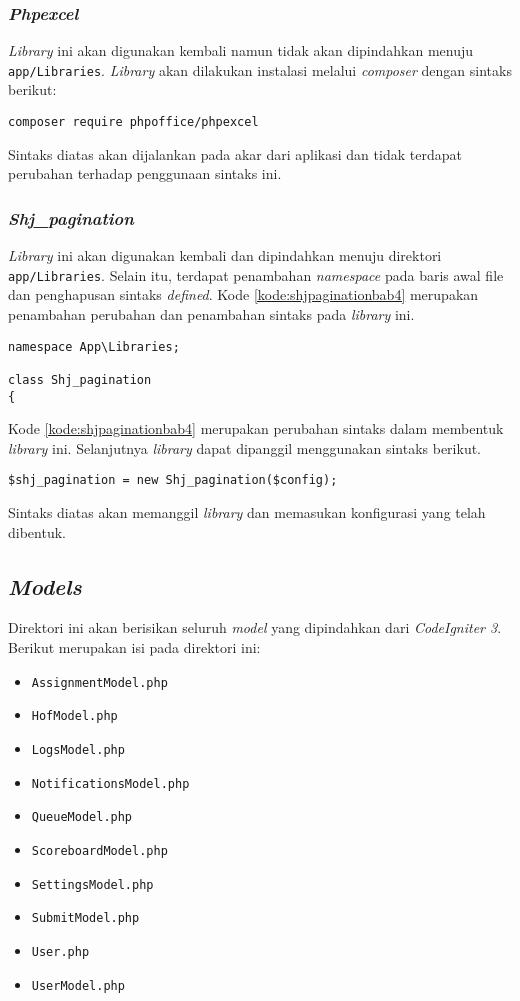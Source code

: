 \subsubsection{\textit{Phpexcel}}
\textit{Library} ini akan digunakan kembali namun tidak akan dipindahkan menuju \texttt{app/Libraries}. \textit{Library} akan dilakukan instalasi melalui \textit{composer} dengan sintaks berikut:
\begin{center}
	\verb|composer require phpoffice/phpexcel|
\end{center}
Sintaks diatas akan dijalankan pada akar dari aplikasi dan tidak terdapat perubahan terhadap penggunaan sintaks ini.

\subsubsection{\textit{Shj\_pagination}}
\textit{Library} ini akan digunakan kembali dan dipindahkan menuju direktori \texttt{app/Libraries}. Selain itu, terdapat penambahan \textit{namespace} pada baris awal file dan penghapusan sintaks \textit{defined}. Kode \ref{kode:shjpaginationbab4} merupakan penambahan perubahan dan penambahan sintaks pada \textit{library} ini.

\begin{lstlisting}[caption=Perancangan perubahan \textit{library Shj\_pagination} pada \textit{CodeIgniter 4}, label=kode:shjpaginationbab4]
namespace App\Libraries;

class Shj_pagination
{
\end{lstlisting}

Kode \ref{kode:shjpaginationbab4} merupakan perubahan sintaks dalam membentuk \textit{library} ini. Selanjutnya \textit{library} dapat dipanggil menggunakan sintaks berikut.

\begin{center}
\verb|$shj_pagination = new Shj_pagination($config);|
\end{center}

Sintaks diatas akan memanggil \textit{library} dan memasukan konfigurasi yang telah dibentuk.

\subsection{\textit{Models}}
Direktori ini akan berisikan seluruh \textit{model} yang dipindahkan dari \textit{CodeIgniter 3}. Berikut merupakan isi pada direktori ini:
\begin{itemize}
	\item \texttt{AssignmentModel.php}
	\item \texttt{HofModel.php}
	\item \texttt{LogsModel.php}
	\item \texttt{NotificationsModel.php}
	\item \texttt{QueueModel.php}
	\item \texttt{ScoreboardModel.php}
	\item \texttt{SettingsModel.php}
	\item \texttt{SubmitModel.php}
	\item \texttt{User.php}
	\item \texttt{UserModel.php}
\end{itemize}

